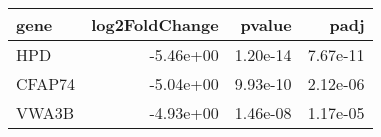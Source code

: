 \begin{tabular}{lrrr}
\toprule
  gene &  log2FoldChange &   pvalue &     padj \\
\midrule
   HPD &       -5.46e+00 & 1.20e-14 & 7.67e-11 \\
CFAP74 &       -5.04e+00 & 9.93e-10 & 2.12e-06 \\
 VWA3B &       -4.93e+00 & 1.46e-08 & 1.17e-05 \\
\bottomrule
\end{tabular}
